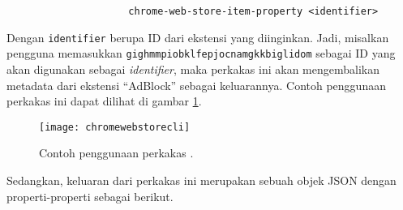 \begin{verbatim}
                     chrome-web-store-item-property <identifier>
\end{verbatim}

Dengan \verb|identifier| berupa ID dari ekstensi yang diinginkan. Jadi, misalkan pengguna memasukkan \verb|gighmmpiobklfepjocnamgkkbiglidom| sebagai ID yang akan digunakan sebagai \textit{identifier}, maka perkakas ini akan mengembalikan metadata dari ekstensi ``AdBlock'' sebagai keluarannya. Contoh penggunaan perkakas ini dapat dilihat di gambar \ref{fig:similarapps-chromewebstorecli}.

\begin{figure}[ht]
    \centering
    \texttt{[image: chromewebstorecli]}
    \caption[Contoh penggunaan perkakas \chromewebstorecli]{Contoh penggunaan perkakas \chromewebstorecli.}
    \label{fig:similarapps-chromewebstorecli}
\end{figure}

Sedangkan, keluaran dari perkakas ini merupakan sebuah objek JSON dengan properti-properti sebagai berikut.

